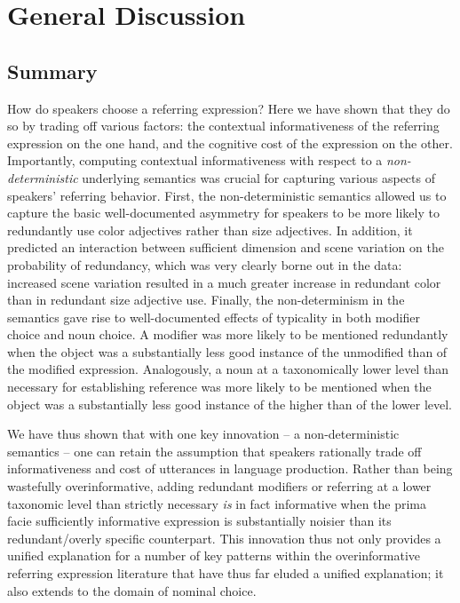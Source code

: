 \documentclass[11pt]{article}
\begin{document}


\section{General Discussion}
\label{sec:gd}

\subsection{Summary}

How do speakers choose a referring expression? Here we have shown that they do so by trading off various factors: the contextual informativeness of the referring expression on the one hand, and the cognitive cost of the expression on the other. Importantly, computing contextual informativeness with respect to a \emph{non-deterministic} underlying semantics was crucial for capturing various aspects of speakers' referring behavior. First, the non-deterministic semantics allowed us to capture the basic well-documented asymmetry for speakers to be more likely to redundantly use color adjectives rather than size adjectives. In addition, it predicted an interaction between sufficient dimension and scene variation on the probability of redundancy, which was very clearly borne out in the data: increased scene variation resulted in a much greater increase in redundant color than in redundant size adjective use. Finally, the non-determinism in the semantics gave rise to well-documented effects of typicality in both modifier choice and noun choice. A modifier was more likely to be mentioned redundantly when the object was a substantially less good instance of the unmodified than of the modified expression. Analogously, a noun at a taxonomically lower level than necessary for establishing reference was more likely to be mentioned when the object was a substantially less good instance of the higher than of the lower level. 

We have thus shown that with one key innovation -- a non-deterministic semantics  -- one can retain the assumption that speakers rationally trade off informativeness and cost of utterances in language production. Rather than being wastefully overinformative, adding redundant modifiers or referring at a lower taxonomic level than strictly necessary \emph{is} in fact informative when the prima facie sufficiently informative expression is substantially noisier than its redundant/overly specific counterpart. This innovation thus not only provides a unified explanation for a number of key patterns within the overinformative referring expression literature that have thus far eluded a unified explanation; it also extends to the domain of nominal choice.
\end{document}
